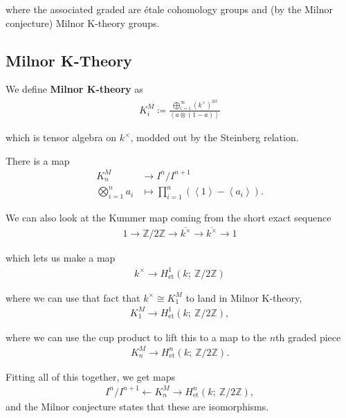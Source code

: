 where the associated graded are étale cohomology groups and (by the
Milnor conjecture) Milnor K-theory groups.

\hypertarget{milnor-k-theory}{%
\subsection{Milnor K-Theory}\label{milnor-k-theory}}

We define \textbf{Milnor K-theory} as
\begin{align*}
K_i^M \coloneqq\frac{\bigoplus_{i=1}^\infty  (k^\times)^{\otimes i} } {\left\langle{a\otimes(1-a)}\right\rangle}
\end{align*}

which is tensor algebra on \(k^\times\), modded out by the Steinberg
relation.

\begin{theorem}

There is a map
\begin{align*} K_n^M &\to I^n/I^{n+1} \\ \bigotimes_{i=1}^n a_i &\mapsto \prod_{i=1}^n \left(\left\langle{1}\right\rangle - \left\langle{a_i}\right\rangle\right) .\end{align*}

We can also look at the Kummer map coming from the short exact sequence
\begin{align*}
1\to {\mathbb{Z}}/2{\mathbb{Z}}\to \overline {k^\times} \to \overline{k^\times} \to 1
\end{align*}

which lets us make a map
\begin{align*}
k^\times \to H_\text{et}^1(k;~{\mathbb{Z}}/2{\mathbb{Z}})
\end{align*}

where we can use that fact that \(k^\times \cong K^M_1\) to land in
Milnor K-theory,
\begin{align*}
K_1^M \to H_\text{et}^1(k;~{\mathbb{Z}}/2{\mathbb{Z}}),
\end{align*}

where we can use the cup product to lift this to a map to the \(n\)th
graded piece
\begin{align*}
K_n^M \to H_\text{et}^n(k;~{\mathbb{Z}}/2{\mathbb{Z}}).
\end{align*}

Fitting all of this together, we get maps
\begin{align*}
I^n/I^{n+1} \leftarrow K_n^M \to H_\text{et}^n(k;~{\mathbb{Z}}/2{\mathbb{Z}}),
\end{align*}
and the Milnor conjecture states that these are isomorphisms.

\end{theorem}

